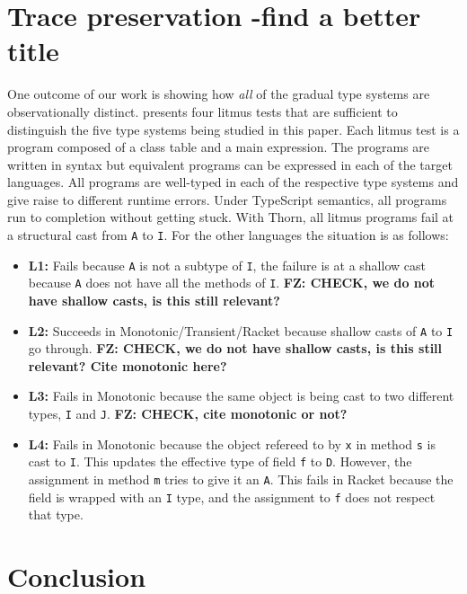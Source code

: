 \documentclass[acmlarge, anonymous, authordraft, review]{acmart} %
\newcommand{\code}[1]{{\tt #1}\xspace}
\newcommand{\FZ}[1]{\textbf{FZ: #1}}
\begin{document}
\section{Trace preservation  -find a better title}\label{litm}


One outcome of our work is showing how \emph{all} of the gradual type systems
are observationally distinct.   presents four litmus tests that
are sufficient to distinguish the five type systems being studied in this
paper.  Each litmus test is a program composed of a class table and a main
expression. The programs are written in \kafka syntax but equivalent
programs can be expressed in each of the target languages. All programs are
well-typed in each of the respective type systems and give raise to
different runtime errors. Under TypeScript semantics, all programs run to
completion without getting stuck. With Thorn, all litmus programs fail at a structural cast from \code A to \code I.  For the other languages the situation is
as follows:
\begin{itemize}
\item {\bf L1:} Fails because \code A is not a subtype of \code I, the
  failure is at a shallow cast because \code A does not have all the methods of
  \code I.   \FZ{CHECK, we do not have shallow casts, is this still relevant?}
\item{\bf L2:} Succeeds in Monotonic/Transient/Racket because shallow casts
  of \code A to \code I go through. \FZ{CHECK, we do not have shallow casts, is this still relevant?  Cite monotonic here?}
\item{\bf L3:} Fails in Monotonic because the same object is being cast to
  two different types, \code I and \code J.  \FZ{CHECK, cite monotonic or not?}
\item{\bf L4:} Fails in Monotonic because the object refereed to by \code x
  in method \code s is cast to \code I. This updates the effective type of field
  \code f to \code D. However, the assignment in method \code m tries to give it
  an \code A. This fails in Racket because the \this field is wrapped with an
  \code I type, and the assignment to \code f does not respect that type.
\end{itemize}



\section{Conclusion}
\end{document}
